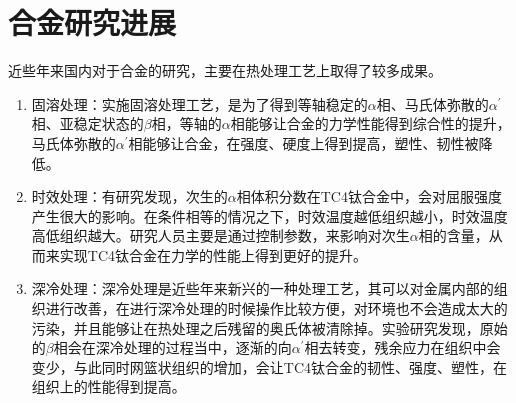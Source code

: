%
%



\section{\ti 合金研究进展}
近些年来国内对于\ti 合金的研究，主要在热处理工艺上取得了较多成果\cite{guokaiTC4taihejinrechuligongyideyanjiuxianzhuangjijinzhan2021}。

\begin{enumerate}
	\item 固溶处理：实施固溶处理工艺，是为了得到等轴稳定的$\alpha$相、马氏体弥散的$ \alpha^{\prime} $相、亚稳定状态的$\beta$相，等轴的$\alpha$相能够让合金的力学性能得到综合性的提升，马氏体弥散的$ \alpha^{\prime} $相能够让合金，在强度、硬度上得到提高，塑性、韧性被降低\cite{gurong2002}。
	\item 时效处理：有研究\cite{luyuanyuanShixiaochuliduiTC4taihejinweiguanzuzhihelixuexingnengdeyingxiang2019}发现，次生的$\alpha$相体积分数在TC4钛合金中，会对屈服强度产生很大的影响。在条件相等的情况之下，时效温度越低组织越小，时效温度高低组织越大。研究人员主要是通过控制参数，来影响对次生$\alpha$相的含量，从而来实现TC4钛合金在力学的性能上得到更好的提升。
	\item 深冷处理：深冷处理是近些年来新兴的一种处理工艺，其可以对金属内部的组织进行改善，在进行深冷处理的时候操作比较方便，对环境也不会造成太大的污染，并且能够让在热处理之后残留的奥氏体被清除掉。实验研究发现，原始的$\beta$相会在深冷处理的过程当中，逐渐的向$\alpha^{\prime}$相去转变，残余应力在组织中会变少，与此同时网篮状组织的增加，会让TC4钛合金的韧性、强度、塑性，在组织上的性能得到提高。
\end{enumerate}

